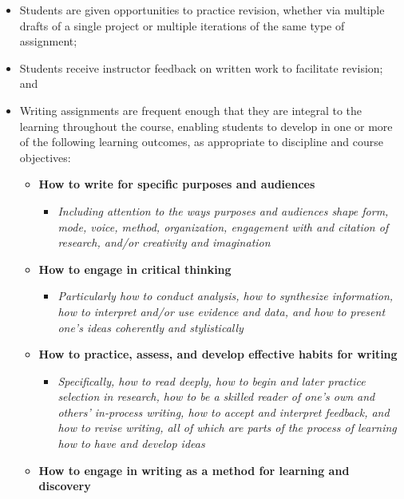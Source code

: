 \documentclass[
  letterpaper,
]{scrbook}
\providecommand{\tightlist}{%
  \setlength{\itemsep}{0pt}\setlength{\parskip}{0pt}}
\begin{document}
\begin{itemize}
\item
  Students are given opportunities to practice revision, whether via
  multiple drafts of a single project or multiple iterations of the same
  type of assignment;
\item
  Students receive instructor feedback on written work to facilitate
  revision; and
\item
  Writing assignments are frequent enough that they are integral to the
  learning throughout the course, enabling students to develop in one or
  more of the following learning outcomes, as appropriate to discipline
  and course objectives:

  \begin{itemize}
  \item
    \textbf{How to write for specific purposes and audiences}

    \begin{itemize}
    \tightlist
    \item
      \emph{Including attention to the ways purposes and audiences shape
      form, mode, voice, method, organization, engagement with and
      citation of research, and/or creativity and imagination}
    \end{itemize}
  \item
    \textbf{How to engage in critical thinking}

    \begin{itemize}
    \tightlist
    \item
      \emph{Particularly how to conduct analysis, how to synthesize
      information, how to interpret and/or use evidence and data, and
      how to present one's ideas coherently and stylistically}
    \end{itemize}
  \item
    \textbf{How to practice, assess, and develop effective habits for
    writing}

    \begin{itemize}
    \tightlist
    \item
      \emph{Specifically, how to read deeply, how to begin and later
      practice selection in research, how to be a skilled reader of
      one's own and others' in-process writing, how to accept and
      interpret feedback, and how to revise writing, all of which are
      parts of the process of learning how to have and develop ideas}
    \end{itemize}
  \item
    \textbf{How to engage in writing as a method for learning and
    discovery}


\end{itemize}
\end{itemize}
\end{document}
